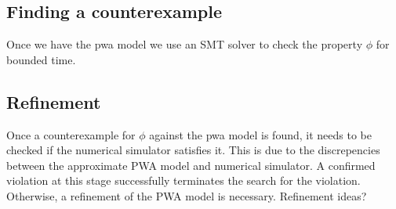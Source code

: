 \subsection{Finding a counterexample} Once we have the pwa model we
use an SMT solver to check the property $\phi$ for bounded time.

\subsection{Refinement} Once a counterexample for $\phi$ against the
pwa model is found, it needs to be checked if the numerical simulator
satisfies it. This is due to the discrepencies between the approximate
PWA model and numerical simulator. A confirmed violation at this stage
successfully terminates the search for the violation. Otherwise, a
refinement of the PWA model is necessary.
Refinement ideas?
